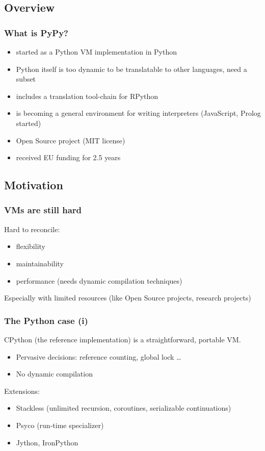 \documentclass[utf8]{beamer}
\begin{document}
\subsection{Overview}
\begin{frame}
  \frametitle{What is PyPy?}
  \begin{itemize}
  \item
    started as a Python VM implementation in Python
  \item
    Python itself is too dynamic to be translatable to other languages, need a subset
  \item
    includes a translation tool-chain for RPython
  \item
    is becoming a general environment for writing interpreters (JavaScript, Prolog started)
  \item
    Open Source project (MIT license)
  \item
    received EU funding for 2.5 years
  \end{itemize}

\end{frame}

\subsection{Motivation}
\begin{frame}
  \frametitle{VMs are still hard}
  Hard to reconcile:

  \begin{itemize}
  \item
    flexibility
  \item
    maintainability
  \item
    performance (needs dynamic compilation techniques)
  \end{itemize}
  Especially with limited resources (like Open Source projects, research projects)
\end{frame}


\begin{frame}
  \frametitle{The Python case (i)}
  CPython (the reference implementation) is a straightforward, portable VM.

  \begin{itemize}
  \item
    Pervasive decisions: reference counting, global lock \dots
  \item
    No dynamic compilation
  \end{itemize}
  \begin{block}{
    Extensions:}
    \begin{itemize}
    \item
      \alert{Stackless} (unlimited recursion, coroutines, serializable continuations)
    \item
      \alert{Psyco} (run-time specializer)
    \item
      \alert{Jython}, \alert{IronPython}
    \end{itemize}
  \end{block}
\end{frame}
\end{document}
